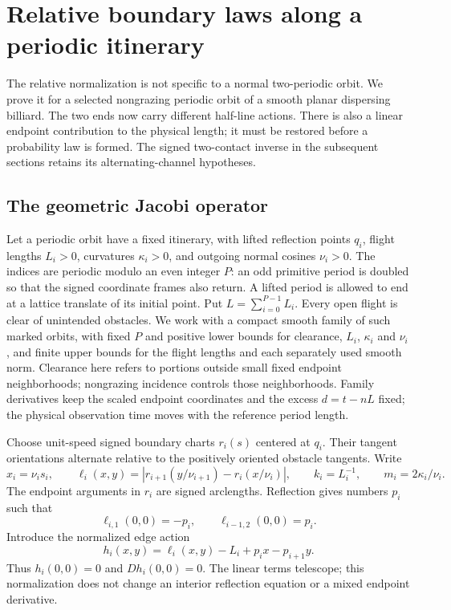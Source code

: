 \section{Relative boundary laws along a periodic itinerary}
\label{sec:v64-periodic-itinerary}

The relative normalization is not specific to a normal two-periodic
orbit.  We prove it for a selected nongrazing periodic orbit of a smooth
planar dispersing billiard.  The two ends now carry different half-line
actions.  There is also a linear endpoint contribution to the physical
length; it must be restored before a probability law is formed.
The signed two-contact inverse in the subsequent sections retains its
alternating-channel hypotheses.

\subsection{The geometric Jacobi operator}

Let a periodic orbit have a fixed itinerary, with lifted reflection points
$q_i$, flight lengths $L_i>0$, curvatures $\kappa_i>0$, and outgoing
normal cosines $\nu_i>0$.  The indices are periodic modulo an even
integer $P$: an odd primitive period is doubled so that the signed
coordinate frames also return.  A lifted period is allowed to end at a
lattice translate of its initial point.  Put $L=\sum_{i=0}^{P-1}L_i$.
Every open flight is clear of unintended obstacles.  We work with a
compact smooth family of such marked orbits, with fixed $P$ and positive
lower bounds for clearance, $L_i$, $\kappa_i$ and $\nu_i$, and finite
upper bounds for the flight lengths and each separately used smooth norm.
Clearance here refers to portions outside small fixed endpoint
neighborhoods; nongrazing incidence controls those neighborhoods.
Family derivatives keep the scaled endpoint coordinates and the excess
$d=t-nL$ fixed; the physical observation time moves with the reference
period length.

Choose unit-speed signed boundary charts $r_i(s)$ centered at $q_i$.
Their tangent orientations alternate relative to the positively oriented
obstacle tangents.  Write
\[
 x_i=\nu_i s_i,\qquad
 \ell_i(x,y)=|r_{i+1}(y/\nu_{i+1})-r_i(x/\nu_i)|,
 \qquad k_i=L_i^{-1},\qquad m_i=2\kappa_i/\nu_i.
\]
The endpoint arguments in $r_i$ are signed arclengths.  Reflection gives
numbers $p_i$ such that
\[
 \ell_{i,1}(0,0)=-p_i,\qquad \ell_{i-1,2}(0,0)=p_i.
\]
Introduce the normalized edge action
\begin{equation}\label{eq:v64-edge-gauge}
 h_i(x,y)=\ell_i(x,y)-L_i+p_i x-p_{i+1}y.
\end{equation}
Thus $h_i(0,0)=0$ and $Dh_i(0,0)=0$.  The linear terms telescope;
this normalization does not change an interior reflection equation or
a mixed endpoint derivative.

